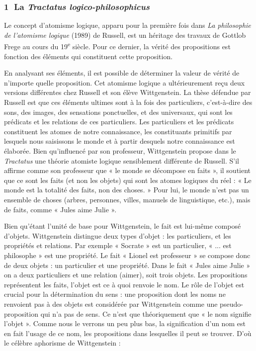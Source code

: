 \subsubsection*{\textcircled{\scriptsize 1} La \textit{Tractatus logico-philosophicus}}
Le concept d’atomisme logique, apparu pour la première fois dans \textit{La philosophie de l’atomisme logique} (1989) de Russell, est un héritage des travaux de Gottlob Frege au cours du 19\textsuperscript{e} siècle. Pour ce dernier, la vérité des propositions est fonction des éléments qui constituent cette proposition.

En analysant ses éléments, il est possible de déterminer la valeur de vérité de n’importe quelle proposition. Cet atomisme logique a ultérieurement reçu deux versions différentes chez Russell et son élève Wittgenstein. La thèse défendue par Russell est que ces éléments ultimes sont à la fois des particuliers, c’est-à-dire des sons, des images, des sensations ponctuelles, et des universaux, qui sont les prédicats et les relations de ces particuliers. Les particuliers et les prédicats constituent les atomes de notre connaissance, les constituants primitifs par lesquels nous saisissons le monde et à partir desquels notre connaissance est élaborée. Bien qu’influencé par son professeur, Wittgenstein propose dans le \textit{Tractatus} une théorie atomiste logique sensiblement différente de Russell. S’il affirme comme son professeur que « le monde se décompose en faits », il soutient que ce sont les faits (et non les objets) qui sont les atomes logiques du réel : « Le monde est la totalité des faits, non des choses. » Pour lui, le monde n’est pas un ensemble de choses (arbres, personnes, villes, manuels de linguistique, etc.), mais de faits, comme « Jules aime Julie ».

Bien qu’étant l’unité de base pour Wittgenstein, le fait est lui-même composé d’objets. Wittgenstein distingue deux types d’objet : les particuliers, et les propriétés et relations. Par exemple « Socrate » est un particulier, « ... est philosophe » est une propriété. Le fait « Lionel est professeur » se compose donc de deux objets : un particulier et une propriété. Dans le fait « Jules aime Julie » on a deux particuliers et une relation (aimer), soit trois objets. Les propositions représentent les faits, l’objet est ce à quoi renvoie le nom. Le rôle de l’objet est crucial pour la détermination du sens : une proposition dont les noms ne renvoient pas à des objets est considérée par Wittgenstein comme une pseudo-proposition qui n’a pas de sens. Ce n’est que théoriquement que « le nom signifie l’objet ». Comme nous le verrons un peu plus bas, la signification d’un nom est en fait l’usage de ce nom, les propositions dans lesquelles il peut se trouver. D’où le célèbre aphorisme de Wittgenstein :

